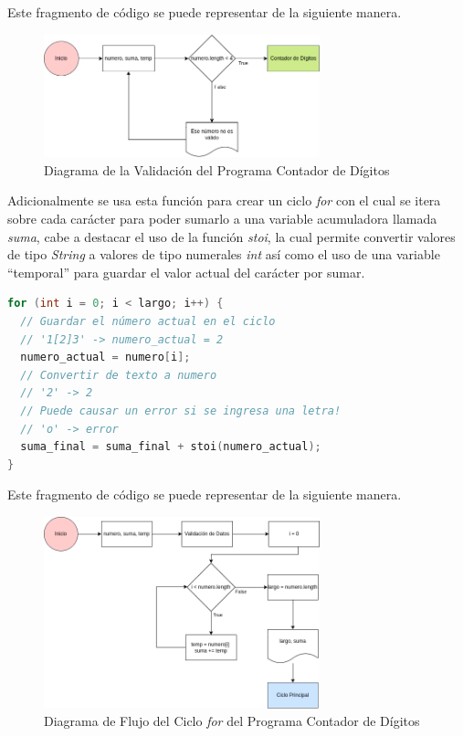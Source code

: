 \documentclass{article}
\begin{document}
Este fragmento de código se puede representar de la siguiente manera.

\begin{figure}[H]
    \centering
    \includegraphics[width=8cm]{contador_digitos_validacion}
    \caption{Diagrama de la Validación del Programa Contador de Dígitos}
\end{figure}

Adicionalmente se usa esta función para crear un ciclo \emph{for} con el cual se itera sobre cada carácter para poder sumarlo a una variable acumuladora llamada \emph{suma}, cabe a destacar el uso de la función \emph{stoi}, la cual permite convertir valores de tipo \emph{String} a valores de tipo numerales \emph{int} así como el uso de una variable ``temporal'' para guardar el valor actual del carácter por sumar.

\begin{lstlisting}[style=mystyle, language=c++]
for (int i = 0; i < largo; i++) {
  // Guardar el número actual en el ciclo
  // '1[2]3' -> numero_actual = 2
  numero_actual = numero[i];
  // Convertir de texto a numero
  // '2' -> 2
  // Puede causar un error si se ingresa una letra!
  // 'o' -> error
  suma_final = suma_final + stoi(numero_actual);
}
\end{lstlisting}

Este fragmento de código se puede representar de la siguiente manera.

\begin{figure}[H]
    \centering
    \includegraphics[width=8cm]{contador_digitos_ciclo}
    \caption{Diagrama de Flujo del Ciclo \emph{for} del Programa Contador de Dígitos}
\end{figure}
\end{document}
